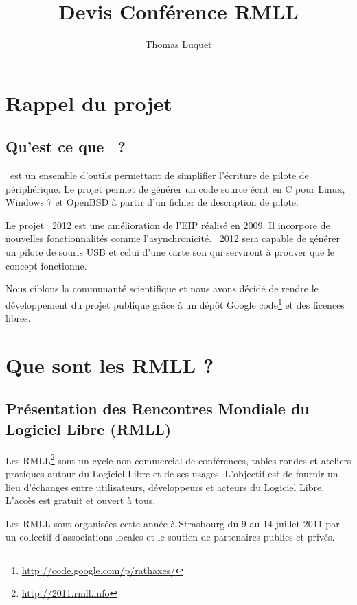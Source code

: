 \documentclass{rtxreport}
\author{Thomas Luquet}
\title{Devis Conférence RMLL}
\begin{document}
\maketitle

\tableofcontents

\chapter{Rappel du projet}

\section{Qu'est ce que \rtx\ ?}

\rtx\ est un ensemble d'outils permettant de simplifier l'écriture de pilote de
périphérique. Le projet permet de générer un code source écrit en C pour Linux,
Windows 7 et OpenBSD à partir d'un fichier de description de pilote.

Le projet \rtx\ 2012 est une amélioration de l'EIP réalisé en 2009. Il
incorpore de nouvelles fonctionnalités comme l’asynchronicité. \rtx\ 2012 sera
capable de générer un pilote de souris USB et celui d'une carte son qui
serviront à prouver que le concept fonctionne.

Nous ciblons la communauté scientifique et nous avons décidé de rendre le
développement du projet publique grâce à un dépôt Google
code\footnote{\url{http://code.google.com/p/rathaxes/}} et des licences libres.



\chapter{Que sont les RMLL ?}

\section{Présentation des Rencontres Mondiale du Logiciel Libre (RMLL)}

Les RMLL\footnote{\url{http://2011.rmll.info}} sont un cycle non commercial de
conférences, tables rondes et ateliers pratiques autour du Logiciel Libre et de
ses usages. L’objectif est de fournir un lieu d’échanges entre utilisateurs,
développeurs et acteurs du Logiciel Libre. L’accès est gratuit et ouvert à
tous.

Les RMLL sont organisées cette année à Strasbourg du 9 au 14 juillet 2011 par
un collectif d’associations locales et le soutien de partenaires publics et
privés.
\end{document}
